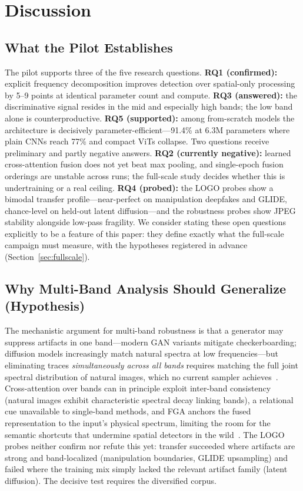 \documentclass[journal]{IEEEtran}
\begin{document}
\section{Discussion}
\label{sec:discussion}

\subsection{What the Pilot Establishes}
The pilot supports three of the five research questions. \textbf{RQ1 (confirmed):} explicit frequency decomposition improves detection over spatial-only processing by 5--9 points at identical parameter count and compute. \textbf{RQ3 (answered):} the discriminative signal resides in the mid and especially high bands; the low band alone is counterproductive. \textbf{RQ5 (supported):} among from-scratch models the architecture is decisively parameter-efficient---91.4\% at 6.3M parameters where plain CNNs reach 77\% and compact ViTs collapse. Two questions receive preliminary and partly negative answers. \textbf{RQ2 (currently negative):} learned cross-attention fusion does not yet beat max pooling, and single-epoch fusion orderings are unstable across runs; the full-scale study decides whether this is undertraining or a real ceiling. \textbf{RQ4 (probed):} the LOGO probes show a bimodal transfer profile---near-perfect on manipulation deepfakes and GLIDE, chance-level on held-out latent diffusion---and the robustness probes show JPEG stability alongside low-pass fragility. We consider stating these open questions explicitly to be a feature of this paper: they define exactly what the full-scale campaign must measure, with the hypotheses registered in advance (Section~\ref{sec:fullscale}).

\subsection{Why Multi-Band Analysis Should Generalize (Hypothesis)}
The mechanistic argument for multi-band robustness is that a generator may suppress artifacts in one band---modern GAN variants mitigate checkerboarding; diffusion models increasingly match natural spectra at low frequencies---but eliminating traces \emph{simultaneously across all bands} requires matching the full joint spectral distribution of natural images, which no current sampler achieves~\cite{corvi2023,ricker2024}. Cross-attention over bands can in principle exploit inter-band consistency (natural images exhibit characteristic spectral decay linking bands), a relational cue unavailable to single-band methods, and FGA anchors the fused representation to the input's physical spectrum, limiting the room for the semantic shortcuts that undermine spatial detectors in the wild~\cite{yan2025sanity,shuai2026shortcuts}. The LOGO probes neither confirm nor refute this yet: transfer succeeded where artifacts are strong and band-localized (manipulation boundaries, GLIDE upsampling) and failed where the training mix simply lacked the relevant artifact family (latent diffusion). The decisive test requires the diversified corpus.
\end{document}
